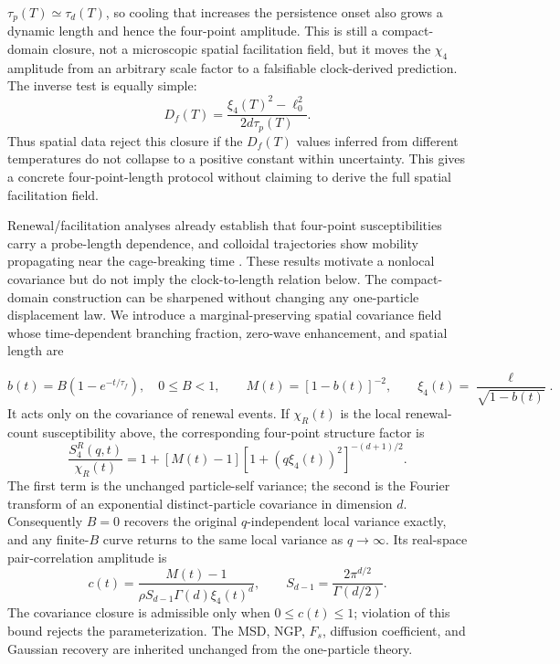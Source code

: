 \documentclass[aps,preprint,onecolumn,superscriptaddress,nofootinbib]{revtex4-2}
\begin{document}
$\tau_p(T)\simeq\tau_d(T)$, so cooling that increases the persistence onset
also grows a dynamic length and hence the four-point amplitude. This is still a
compact-domain closure, not a microscopic spatial facilitation field, but it
moves the $\chi_4$ amplitude from an arbitrary scale factor to a falsifiable
clock-derived prediction.
The inverse test is equally simple:
\begin{equation}
  D_f(T)=\frac{\xi_4(T)^2-\ell_0^2}{2d\tau_p(T)}.
\end{equation}
Thus spatial data reject this closure if the $D_f(T)$ values inferred from
different temperatures do not collapse to a positive constant within
uncertainty. This gives a concrete four-point-length protocol without claiming
to derive the full spatial facilitation field.

Renewal/facilitation analyses already establish that four-point
susceptibilities carry a probe-length dependence, and colloidal trajectories
show mobility propagating near the cage-breaking time
\cite{chandler2006fourpoint,franklin2014facilitation}.  These results motivate a
nonlocal covariance but do not imply the clock-to-length relation below.  The
compact-domain construction can be sharpened without changing any one-particle
displacement law.  We introduce a marginal-preserving spatial covariance field
whose time-dependent branching fraction, zero-wave enhancement, and spatial
length are

\begin{equation}
  b(t)=B\left(1-e^{-t/\tau_f}\right),\quad 0\leq B<1,
  \qquad
  M(t)=[1-b(t)]^{-2},\qquad
  \xi_4(t)=\frac{\ell}{\sqrt{1-b(t)}}.
\end{equation}
It acts only on the covariance of renewal events.  If $\chi_R(t)$ is the local
renewal-count susceptibility above, the corresponding four-point structure
factor is
\begin{equation}
  \frac{S_4^R(q,t)}{\chi_R(t)}
  =1+[M(t)-1]\left[1+(q\xi_4(t))^2\right]^{-(d+1)/2}.
\end{equation}
The first term is the unchanged particle-self variance; the second is the
Fourier transform of an exponential distinct-particle covariance in dimension
$d$.  Consequently $B=0$ recovers the original $q$-independent local variance
exactly, and any finite-$B$ curve returns to the same local variance as
$q\to\infty$.  Its real-space pair-correlation amplitude is
\begin{equation}
  c(t)=\frac{M(t)-1}
  {\rho S_{d-1}\Gamma(d)\xi_4(t)^d},\qquad
  S_{d-1}=\frac{2\pi^{d/2}}{\Gamma(d/2)}.
\end{equation}
The covariance closure is admissible only when $0\leq c(t)\leq1$; violation of
this bound rejects the parameterization.  The MSD, NGP, $F_s$, diffusion
coefficient, and Gaussian recovery are inherited unchanged from the
one-particle theory.
\end{document}
